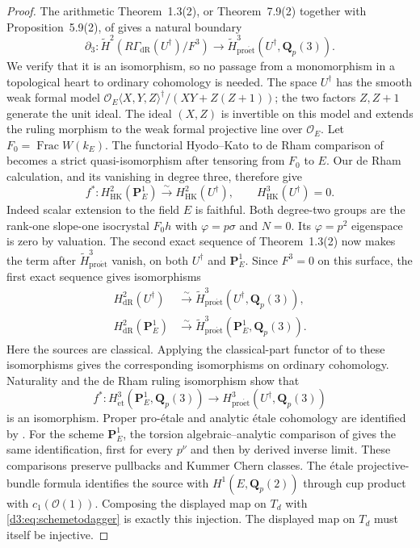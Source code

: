 \documentclass[11pt,a4paper]{amsart}
\numberwithin{equation}{section}
\theoremstyle{definition}
\theoremstyle{remark}
\newcommand{\Q}{\mathbf Q}
\newcommand{\PP}{\mathbf P}
\newcommand{\OO}{\mathcal O}
\newcommand{\Frac}{\operatorname{Frac}}
\begin{document}
\begin{proof}
The arithmetic Theorem~1.3(2), or Theorem~7.9(2) together with Proposition~5.9(2), of \cite{ColmezNiziol} gives a natural boundary
\[
\partial_3:\widetilde H^2(R\Gamma_{\mathrm{dR}}(U^\dagger)/F^3)
\longrightarrow\widetilde H^3_{\mathrm{pro\acute et}}(U^\dagger,\Q_p(3)).
\]
We verify that it is an isomorphism, so no passage from a monomorphism in a topological heart to ordinary cohomology is needed. The space $U^\dagger$ has the smooth weak formal model
$\OO_E\langle X,Y,Z\rangle^\dagger/(XY+Z(Z+1))$; the two factors $Z,Z+1$ generate the unit ideal. The ideal $(X,Z)$ is invertible on this model and extends the ruling morphism to the weak formal projective line over $\OO_E$. Let $F_0=\Frac W(k_E)$. The functorial Hyodo--Kato to de Rham comparison of \cite[equation~(5.4) and Propositions~5.5--5.6]{ColmezNiziol} becomes a strict quasi-isomorphism after tensoring from $F_0$ to $E$. Our de Rham calculation, and its vanishing in degree three, therefore give
\[
f^*:H^2_{\mathrm{HK}}(\PP^1_E)\xrightarrow{\sim}H^2_{\mathrm{HK}}(U^\dagger),
\qquad H^3_{\mathrm{HK}}(U^\dagger)=0.
\]
Indeed scalar extension to the field $E$ is faithful. Both degree-two groups are the rank-one slope-one isocrystal $F_0h$ with $\varphi=p\sigma$ and $N=0$. Its $\varphi=p^2$ eigenspace is zero by valuation. The second exact sequence of Theorem~1.3(2) now makes the term after $\widetilde H^3_{\mathrm{pro\acute et}}$ vanish, on both $U^\dagger$ and $\PP^1_E$. Since $F^3=0$ on this surface, the first exact sequence gives isomorphisms
\begin{align*}
H^2_{\mathrm{dR}}(U^\dagger)&\xrightarrow{\sim}\widetilde H^3_{\mathrm{pro\acute et}}(U^\dagger,\Q_p(3)),\\
H^2_{\mathrm{dR}}(\PP^1_E)&\xrightarrow{\sim}\widetilde H^3_{\mathrm{pro\acute et}}(\PP^1_E,\Q_p(3)).
\end{align*}
Here the sources are classical. Applying the classical-part functor of \cite[Section~3.1.1]{ColmezNiziol} to these isomorphisms gives the corresponding isomorphisms on ordinary cohomology. Naturality and the de Rham ruling isomorphism show that
\[
f^*:H^3_{\mathrm{\acute et}}(\PP^1_E,\Q_p(3))
\longrightarrow H^3_{\mathrm{pro\acute et}}(U^\dagger,\Q_p(3))
\]
is an isomorphism. Proper pro-\'etale and analytic \'etale cohomology
are identified by \cite[Section~7.2.4]{ColmezNiziol}. For the scheme
$\PP^1_E$, the torsion algebraic--analytic comparison of
\cite[Theorem~6.1.1]{BerkovichEtale} gives the same identification,
first for every $p^\nu$ and then by derived inverse limit.
These comparisons preserve pullbacks and Kummer Chern classes. The \'etale projective-bundle formula identifies the source with $H^1(E,\Q_p(2))$ through cup product with $c_1(\OO(1))$. Composing the displayed map on $T_d$ with \eqref{d3:eq:schemetodagger} is exactly this injection. The displayed map on $T_d$ must itself be injective.
\end{proof}
\end{document}
